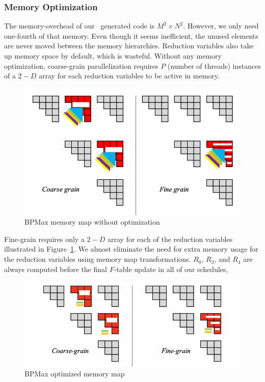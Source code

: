 \subsubsection{Memory Optimization}
The memory-overhead of our \alphaz\ generated code is $M^2 \times N^2$. However, we only need one-fourth of that memory. Even though it seems inefficient, the unused elements are never moved between the memory hierarchies. Reduction variables also take up memory space by default, which is wasteful. Without any memory optimization, coarse-grain parallelization requires $P$ (number of threads) instances of a $2-D$ array for each reduction variables to be active in memory.
\begin{figure}[htbp]
\centerline{\includegraphics[scale=0.69,trim=5 5 5 5,clip]{content/figures/bpm_phase_2_memory_map.png}}
\caption{BPMax memory map without optimization}
\label{fig:bpm_phase_2_memory_map}
\end{figure}
Fine-grain requires only a $2-D$ array for each of the reduction variables illustrated in Figure~\ref{fig:bpm_phase_2_memory_map}. 
We almost eliminate the need for extra memory usage for the reduction variables using memory map transformations. $R_{0}$, $R_{3}$, and $R_{4}$ are always computed before the final $F$-table update in all of our schedules,
\begin{figure}[htbp]
\centerline{\includegraphics[scale=0.70, trim=5 5 5 5,clip]{content/figures/bpm_phase_3_memory_map.png}}
\caption{BPMax optimized memory map}
\label{fig:bpm_phase_3_memory_map}
\end{figure}
